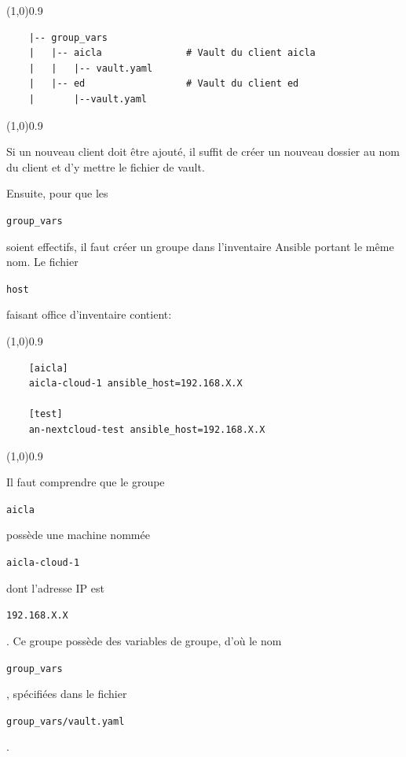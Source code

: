 \documentclass[12pt]{article}
\begin{document}
\vspace{-1ex}
\begin{code}
\vspace{-1ex}
\begin{center} 
    \line(1,0){0.9\textwidth} 
\end{center}
\vspace{-1ex}
\begin{verbatim}
    |-- group_vars
    |   |-- aicla               # Vault du client aicla
    |   |   |-- vault.yaml
    |   |-- ed                  # Vault du client ed
    |       |--vault.yaml
\end{verbatim}
\vspace{-1ex}
\begin{center} 
    \line(1,0){0.9\textwidth} 
\end{center}
\vspace{-1ex}
\end{code}

Si un nouveau client doit être ajouté, il suffit de créer un nouveau dossier au nom du client et d'y mettre le fichier de vault.

Ensuite, pour que les \begin{code}\texttt{group\_vars}\end{code} soient effectifs, il faut créer un groupe dans l'inventaire \gls{Ansible} portant le même nom. 
Le fichier \begin{code}\texttt{host}\end{code} faisant office d'inventaire contient:
\vspace{-1ex}
\begin{code}
\vspace{-1ex}
\begin{center} 
    \line(1,0){0.9\textwidth} 
\end{center}
\vspace{-1ex}
\begin{verbatim}
    [aicla]
    aicla-cloud-1 ansible_host=192.168.X.X
    
    [test]
    an-nextcloud-test ansible_host=192.168.X.X
\end{verbatim}
\vspace{-1ex}
\begin{center} 
    \line(1,0){0.9\textwidth} 
\end{center}
\vspace{-1ex}
\end{code}


Il faut comprendre que le groupe \begin{code}\texttt{aicla}\end{code} possède une machine nommée \begin{code}\texttt{aicla-cloud-1}\end{code} dont l'adresse \gls{IP} est \begin{code}\texttt{192.168.X.X}\end{code}. 
Ce groupe possède des variables de groupe, d'où le nom \begin{code}\texttt{group\_vars}\end{code}, spécifiées dans le fichier \begin{code}\texttt{group\_vars/vault.yaml}\end{code}.
\end{document}
